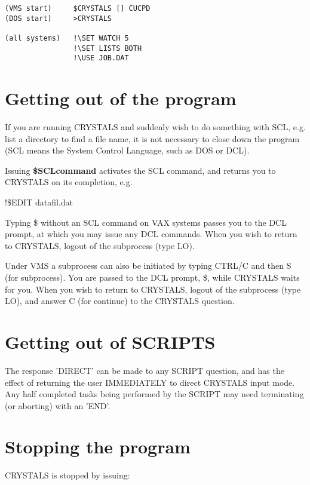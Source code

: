 \documentclass[10pt,a4paper]{report}
\begin{document}
\small\begin{verbatim}
(VMS start)     $CRYSTALS [] CUCPD
(DOS start)     >CRYSTALS

(all systems)   !\SET WATCH 5
                !\SET LISTS BOTH
                !\USE JOB.DAT
\end{verbatim}\normalsize





\section{Getting out of the program}


If you are running CRYSTALS and suddenly wish to do something with SCL, e.g.
 list a directory to find a file name, it is not necessary to close down the
 program (SCL means the System Control Language, such as DOS or DCL).


Issuing {\bf \$SCLcommand} activates the SCL command, and returns you to CRYSTALS
 on its completion, e.g.


!\$EDIT datafil.dat


Typing \$ without an SCL command on VAX systems passes you to the DCL
 prompt, at which you
 may issue any DCL commands. When you wish to return to CRYSTALS, logout of
 the subprocess (type LO).


Under VMS a subprocess can also be initiated by typing CTRL/C and then S (for
 subprocess). You are passed to the DCL prompt, \$, while CRYSTALS waits for
 you. When you wish to return to CRYSTALS, logout of the subprocess (type LO),
 and answer C (for continue) to the CRYSTALS question.



\section{Getting out of SCRIPTS}
 The response 'DIRECT' can be made to any SCRIPT question, and has the effect
 of returning the user IMMEDIATELY to direct CRYSTALS input mode. Any half
 completed tasks being performed by the SCRIPT may need terminating (or
      aborting) with an 'END'.



\section{Stopping the program}



CRYSTALS is stopped by issuing:
\end{document}
